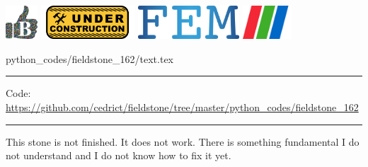 \noindent
\includegraphics[height=1.25cm]{images/pictograms/benchmark}
\includegraphics[height=1.25cm]{images/pictograms/under_construction}
\includegraphics[height=1.25cm]{images/pictograms/FEM}
\includegraphics[height=1.25cm]{images/pictograms/paraview}


\begin{flushright} {\tiny {\color{gray} python\_codes/fieldstone\_162/text.tex}} \end{flushright}

%

\par\noindent\rule{\textwidth}{0.4pt}

\begin{center}
\inpython
{\small Code: \url{https://github.com/cedrict/fieldstone/tree/master/python_codes/fieldstone_162}}
\end{center}

\par\noindent\rule{\textwidth}{0.4pt}


{\color{red} This stone is not finished. It does not work. There is something 
fundamental I do not understand and I do not know how to fix it yet.}

\vspace{.5cm}

